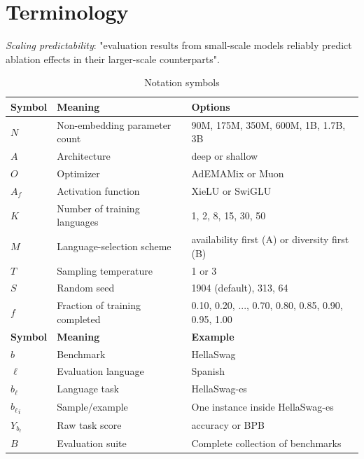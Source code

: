 \section{Terminology}

\textit{Scaling predictability}: "evaluation results from small-scale models reliably predict ablation effects in their larger-scale counterparts".


\begin{table}[th]
    \centering
    \begin{tabular}{lll}
        \toprule
        \textbf{Symbol} & \textbf{Meaning} & \textbf{Options} \\
        \hline
        \(N\) & Non-embedding parameter count & 90M, 175M, 350M, 600M, 1B, 1.7B, 3B \\
        \hline
        \(A\) & Architecture & deep or shallow \\
        \hline
        \(O\) & Optimizer & AdEMAMix or Muon \\
        \hline
        \(A_f\) & Activation function & XieLU or SwiGLU \\
        \hline
        \(K\) & Number of training languages & 1, 2, 8, 15, 30, 50 \\
        \hline
        \(M\) & Language-selection scheme & availability first (A) or diversity first (B) \\
        \hline
        \(T\) & Sampling temperature & 1 or 3 \\
        \hline
        \(S\) & Random seed & 1904 (default), 313, 64 \\
        \hline
        \(f\) & Fraction of training completed & 0.10, 0.20, ..., 0.70, 0.80, 0.85, 0.90, 0.95, 1.00 \\
        \bottomrule
        \toprule
        \textbf{Symbol} & \textbf{Meaning} & \textbf{Example} \\
        \hline
        \(b\) & Benchmark & HellaSwag \\
        \hline
        \(\ell\) & Evaluation language & Spanish \\
        \hline
        \(b_\ell\) & Language task & HellaSwag-es \\
        \hline
        \({b_\ell}_i\) & Sample/example & One instance inside HellaSwag-es \\
        \hline
        \(Y_{b_\ell}\) & Raw task score & accuracy or BPB \\
        \hline
        \(B\) & Evaluation suite & Complete collection of benchmarks \\
        \bottomrule
    \end{tabular}
    \caption{Notation symbols}
    \label{tab:notation-symbols}
\end{table}

